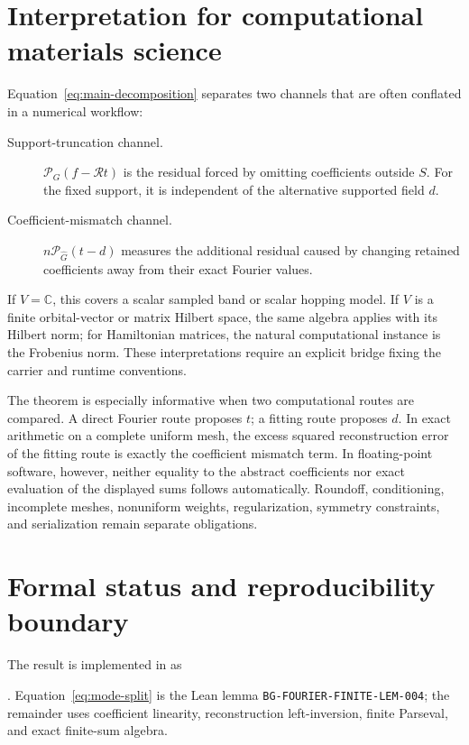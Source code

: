 \documentclass[11pt]{article}
\begin{document}
\section{Interpretation for computational materials science}
Equation~\eqref{eq:main-decomposition} separates two channels that are often conflated in a
numerical workflow:
\begin{description}
  \item[Support-truncation channel.]
  $\mathcal P_G(f-\mathcal R t)$ is the residual forced by omitting coefficients outside $S$.
  For the fixed support, it is independent of the alternative supported field $d$.
  \item[Coefficient-mismatch channel.]
  $n\mathcal P_{\widehat G}(t-d)$ measures the additional residual caused by changing retained
  coefficients away from their exact Fourier values.
\end{description}
If $V=\mathbb C$, this covers a scalar sampled band or scalar hopping model.  If $V$ is a finite
orbital-vector or matrix Hilbert space, the same algebra applies with its Hilbert norm; for
Hamiltonian matrices, the natural computational instance is the Frobenius norm.  These
interpretations require an explicit bridge fixing the carrier and runtime conventions.

The theorem is especially informative when two computational routes are compared.  A direct
Fourier route proposes $t$; a fitting route proposes $d$.  In exact arithmetic on a complete
uniform mesh, the excess squared reconstruction error of the fitting route is exactly the
coefficient mismatch term.  In floating-point software, however, neither equality to the abstract
coefficients nor exact evaluation of the displayed sums follows automatically.  Roundoff,
conditioning, incomplete meshes, nonuniform weights, regularization, symmetry constraints, and
serialization remain separate obligations.

\section{Formal status and reproducibility boundary}
The result is implemented in
 as
\par\noindent
{}.
Equation~\eqref{eq:mode-split} is the Lean lemma
\texttt{BG-FOURIER-FINITE-LEM-004}; the remainder uses coefficient linearity, reconstruction
left-inversion, finite Parseval, and exact finite-sum algebra.
\end{document}
